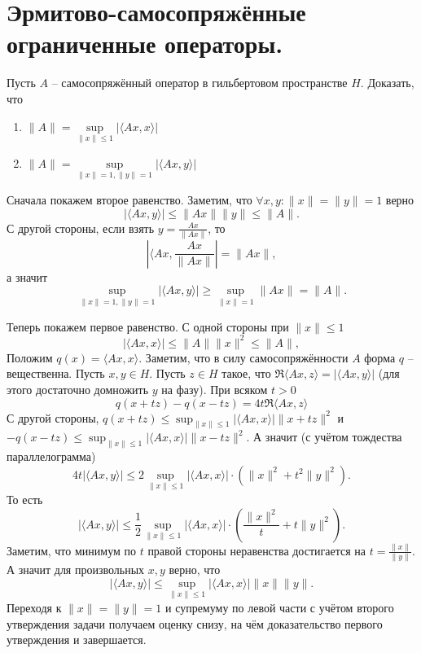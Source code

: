 \section{Эрмитово-самосопряжённые ограниченные операторы.}
\begin{task}[11.5]
    Пусть $A$ -- самосопряжённый оператор в гильбертовом пространстве $H$.
    Доказать, что 
    \begin{enumerate}
        \item $\|A\| = \sup\limits_{\|x\| \leq 1} |\langle Ax, x \rangle|$
        \item $\|A\| = \sup\limits_{\|x\| = 1, \|y\| = 1}|\langle Ax, y \rangle|$
    \end{enumerate}
\end{task}
\begin{solution}
    Сначала покажем второе равенство.
    Заметим, что $\forall x, y\colon \|x\| = \|y\| = 1$ верно
    \[
        |\langle Ax, y \rangle| \leq \|Ax\|\|y\| \leq \|A\|.
    \]
    С другой стороны, если взять $y = \frac{Ax}{\|Ax\|}$, то
    \[
        \left|\langle Ax, \frac{Ax}{\|Ax\|}\right| = \|Ax\|,
    \]
    а значит
    \[
        \sup\limits_{\|x\| = 1, \|y\| = 1} |\langle Ax, y \rangle| \geq  \sup\limits_{\|x\| = 1} \|Ax\| = \|A\|.
    \]

    Теперь покажем первое равенство.
    С одной стороны при $\|x\| \leq 1$
    \[
        |\langle Ax, x\rangle| \leq \|A\|\|x\|^2 \leq \|A\|,
    \]
    Положим $q(x) = \langle Ax, x \rangle$.
    Заметим, что в силу самосопряжённости $A$ форма $q$ -- вещественна.
    Пусть $x, y \in H$. Пусть $z \in H$ такое, что $\Re \langle Ax, z \rangle = |\langle Ax, y \rangle |$ (для этого достаточно домножить $y$ на фазу).
    При всяком $t > 0$
    \[
        q(x + tz) - q(x - tz) = 4t \Re \langle Ax, z \rangle
    \]
    С другой стороны, $q(x + tz) \leq \sup_{\|x\| \leq 1}|\langle Ax, x \rangle| \|x + tz\|^2$
    и $-q(x - tz) \leq \sup_{\|x\| \leq 1}|\langle Ax, x \rangle| \|x - tz\|^2 $.
    А значит (с учётом тождества параллелограмма)
    \[
        4t|\langle Ax, y \rangle| \leq 2\sup_{\|x\| \leq 1}|\langle Ax, x \rangle| \cdot (\|x\|^2 + t^2\|y\|^2).
    \]
    То есть
    \[
        |\langle Ax, y \rangle| \leq \frac{1}{2}\sup_{\|x\| \leq 1}|\langle Ax, x \rangle| \cdot \left(\frac{\|x\|^2}{t} + t \|y\|^2\right).
    \]
    Заметим, что минимум по $t$ правой стороны неравенства достигается на $t = \frac{\|x\|}{\|y\|}$.
    А значит для произвольных $x, y$ верно, что
    \[
        |\langle Ax, y \rangle| \leq \sup_{\|x\| \leq 1}|\langle Ax, x \rangle| \|x\|\|y\|.
    \]
    Переходя к $\|x\| = \|y\| = 1$ и супремуму по левой части с учётом второго утверждения задачи получаем оценку снизу, на чём доказательство первого утверждения и завершается.
\end{solution}
